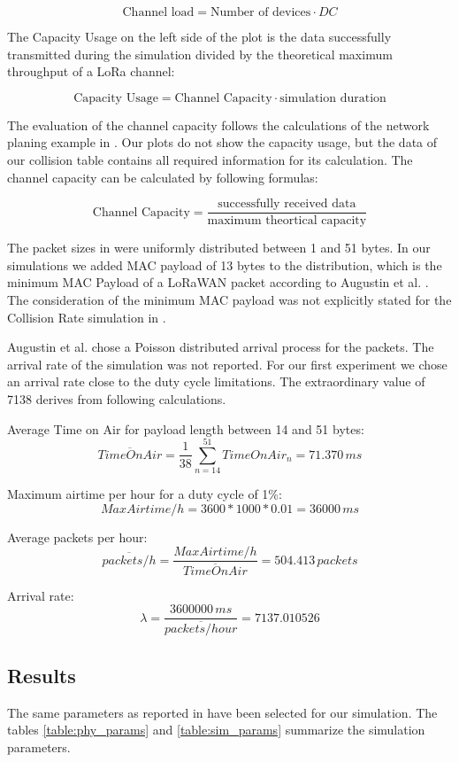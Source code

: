 \documentclass{article}
\begin{document}
$$ \textrm{Channel load} = \textrm{Number of devices} \cdot DC$$

The Capacity Usage on the left side of the plot is the data successfully
transmitted during the simulation divided by the theoretical maximum throughput
of a LoRa channel: 

$$\textrm{Capacity Usage} = \textrm{Channel Capacity} \cdot \textrm{simulation
duration}$$

The evaluation of the channel capacity follows the calculations of the network
planing example in \cite{loramodulationbasics}. Our plots do not show the
capacity usage, but the data of our collision table contains all required
information for its calculation. The channel capacity can be calculated by
following formulas:

$$\textrm{Channel Capacity} = \frac{\textrm{successfully received
data}}{\textrm{maximum theortical capacity}}$$

The packet sizes in \cite{augustin2016study} were uniformly distributed between
1 and 51 bytes. In our simulations we added MAC payload of 13 bytes to the
distribution, which is the minimum MAC Payload of a LoRaWAN packet according to
Augustin et al. \cite{augustin2016study}. The consideration of the minimum MAC
payload was not explicitly stated for the Collision Rate simulation in
\cite{augustin2016study}.

Augustin et al. chose a Poisson distributed arrival process for the packets.
The arrival rate of the simulation was not reported. For our first experiment
we chose an arrival rate close to the duty cycle limitations. The extraordinary
value of 7138 derives from following calculations.

Average Time on Air for payload length between 14 and 51 bytes:
$$\overline{TimeOnAir} = \frac{1}{38} \sum_{n=14}^{51} TimeOnAir_{n} = 71.370\, ms$$

Maximum airtime per hour for a duty cycle of 1\%:
$$MaxAirtime/h = 3600*1000*0.01 = 36000\, ms$$

Average packets per hour:
$$\overline{packets/h} = \frac{MaxAirtime/h}{\overline{TimeOnAir}} = 504.413\, packets$$

Arrival rate:
$$\lambda = \frac{3600000\, ms}{\overline{packets/hour}} = 7137.010526$$

\subsection{Results}
The same parameters as reported in \cite{augustin2016study} have been selected
for our simulation. The tables \ref{table:phy_params} and
\ref{table:sim_params} summarize the simulation parameters.
\end{document}

